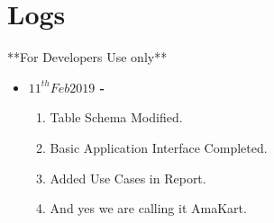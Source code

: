 \documentclass[a4paper,12pt]{article} %
\begin{document}
\section{Logs}
\begin{center}
    **For Developers Use only**
\end{center}
\begin{itemize}
    \item \textbf{$11^{th}Feb2019$ - } \begin{enumerate}
                                          \item Table Schema Modified.
                                          \item Basic Application Interface Completed.
                                          \item Added Use Cases in Report.
                                          \item And yes we are calling it AmaKart.
                                       \end{enumerate}
\end{itemize}
\end{document}
